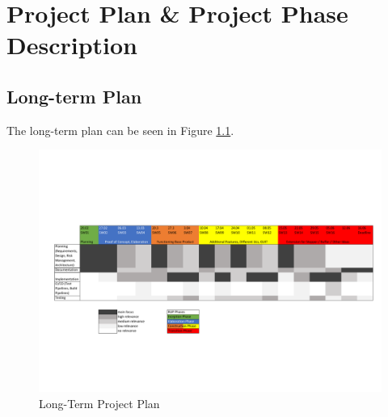 \chapter{Project Plan \& Project Phase Description}

\section{Long-term Plan}

The long-term plan can be seen in Figure \ref*{fig:longTermPlan}.

\begin{figure}[h!t]
    \centering
    \includegraphics[scale=0.80,angle=270]{resources/LongTermPlan.pdf}
    \caption{Long-Term Project Plan}
    \label{fig:longTermPlan}
\end{figure}
